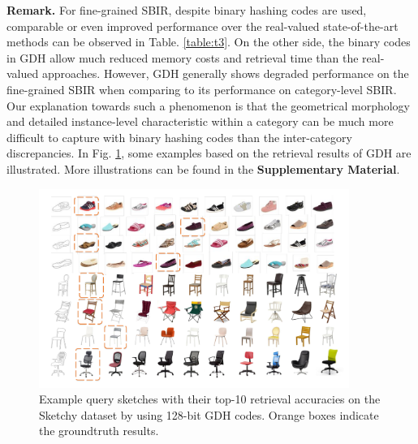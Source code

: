 \documentclass[runningheads]{llncs}
\begin{document}
\textbf{Remark.} For fine-grained SBIR, despite binary hashing codes are used, comparable or even improved performance over the real-valued state-of-the-art methods can be observed in Table. \ref{table:t3}. On the other side, the binary codes in GDH allow much reduced memory costs and retrieval time than the real-valued approaches. However, GDH generally shows degraded performance on the fine-grained SBIR when comparing to its performance on category-level SBIR. Our explanation towards such a phenomenon is that the geometrical morphology and detailed instance-level characteristic within a category can be much more difficult to capture with binary hashing codes than the inter-category discrepancies. In Fig. \ref{fig:finegrained-figure}, some examples based on the retrieval results of GDH are illustrated. More illustrations can be found in the \textbf{Supplementary Material}.



\begin{figure}[t]
    \centering
    \includegraphics[width = 0.9\textwidth]{figures/shoes_results1.pdf}
    \vspace{-2ex}
    \caption{Example query sketches with their top-10 retrieval accuracies on the Sketchy dataset by using 128-bit GDH codes. Orange boxes indicate the groundtruth results.}
    \label{fig:finegrained-figure}
    \vspace{-3ex}
\end{figure}


\end{document}
